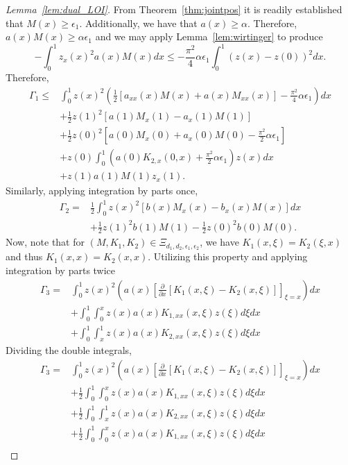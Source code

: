 \documentclass[US letter, 9 pt, conference]{ieeeconf}  \usepackage{setspace}
\newcommand{\pfx}{\frac{\partial}{\partial x}}
\newcommand{\igzo}{\int_0^1}
\newcommand{\igzx}{\int_0^x}
\newcommand{\igxo}{\int_x^1}
\newcommand{\hlf}{\frac{1}{2}}
\begin{document}
\begin{proof}[Lemma~\ref{lem:dual_LOI}]
From Theorem~\ref{thm:jointpos} it is readily established that $M(x) \geq \epsilon_1$. Additionally, we have that $a(x) \geq \alpha$. Therefore, $a(x)M(x) \geq \alpha \epsilon_1$ and we may apply Lemma~\ref{lem:wirtinger} to produce
\[-\igzo z_x(x)^2 a(x)M(x)dx \leq -\frac{\pi^2}{4}\alpha \epsilon_1 \igzo \left(z(x)-z(0)\right)^2 dx. \]
Therefore, \begin{align}
\Gamma_1 \leq & \igzo z(x)^2 \left( \frac{1}{2}\left[a_{xx}(x)M(x)+a(x)M_{xx}(x) \right]-\frac{\pi^2}{4}\alpha \epsilon_1 \right)dx  \nonumber \\
&+ \frac{1}{2}z(1)^2 \left[a(1)M_x(1)-a_x(1)M(1) \right] \nonumber \\
&+ \frac{1}{2} z(0)^2 \left[a(0)M_x(0)+a_x(0)M(0)-\frac{\pi^2}{2}\alpha \epsilon_1 \right] \nonumber \\
&+z(0)\igzo \left(a(0)K_{2,x}(0,x)+\frac{\pi^2}{2}\alpha \epsilon_1 \right)z(x)dx \nonumber \\
&\label{eqn:dual_gamma_1}+z(1)a(1)M(1)z_x(1).
\end{align}
Similarly, applying integration by parts once,
\begin{align}
\Gamma_2 = & \frac{1}{2}\igzo z(x)^2 \left[b(x)M_x(x)-b_x(x)M(x) \right]dx \nonumber \\
&\label{eqn:dual_gamma_2}+\frac{1}{2}z(1)^2 b(1)M(1)-\frac{1}{2}z(0)^2 b(0)M(0).
\end{align}
Now, note that for $(M,K_1,K_2) \in \Xi_{d_1,d_2,\epsilon_1,\epsilon_2}$, we have $K_1(x,\xi)=K_2(\xi,x)$ and thus $K_1(x,x)=K_2(x,x)$. Utilizing this property and applying integration by parts twice
\begin{align}
\Gamma_3 = & \igzo z(x)^2 \left(a(x)\left[\pfx[K_1(x,\xi)-K_2(x,\xi)] \right]_{\xi=x} \right)dx \nonumber \\
&+\igzo \igzx z(x)a(x)K_{1,xx}(x,\xi)z(\xi)d\xi dx \nonumber \\
&+\igzo \igxo z(x)a(x)K_{2,xx}(x,\xi)z(\xi)d\xi dx \nonumber
\end{align} Dividing the double integrals,
\begin{align}
\Gamma_3 = & \igzo z(x)^2 \left(a(x)\left[\pfx[K_1(x,\xi)-K_2(x,\xi)] \right]_{\xi=x} \right)dx \nonumber \\
&+\hlf \igzo \igzx z(x)a(x)K_{1,xx}(x,\xi)z(\xi)d\xi dx \nonumber \\
&+\hlf \igzo \igxo z(x)a(x)K_{2,xx}(x,\xi)z(\xi)d\xi dx \nonumber \\
&+\hlf \igzo \igzx z(x)a(x)K_{1,xx}(x,\xi)z(\xi)d\xi dx \nonumber \\

\end{align}
\end{proof}
\end{document}
